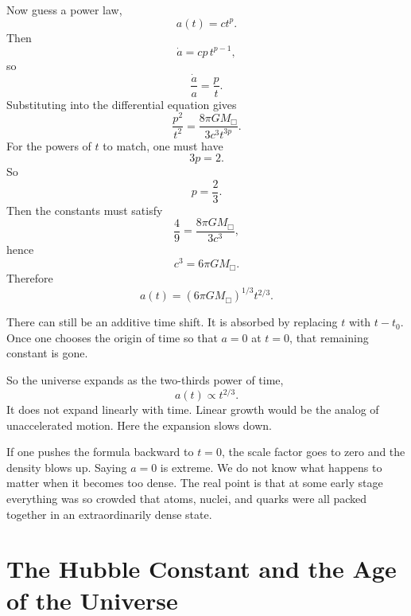 Now guess a power law,
\begin{equation}
a(t)=ct^p.
\end{equation}
Then
\begin{equation}
\dot a = cp\,t^{p-1},
\end{equation}
so
\begin{equation}
\frac{\dot a}{a}=\frac{p}{t}.
\end{equation}
Substituting into the differential equation gives
\begin{equation}
\frac{p^2}{t^2}=\frac{8\pi G M_{\Box}}{3c^3t^{3p}}.
\end{equation}
For the powers of \(t\) to match, one must have
\begin{equation}
3p=2.
\end{equation}
So
\begin{equation}
p=\frac{2}{3}.
\end{equation}
Then the constants must satisfy
\begin{equation}
\frac{4}{9}=\frac{8\pi G M_{\Box}}{3c^3},
\end{equation}
hence
\begin{equation}
c^3=6\pi G M_{\Box}.
\end{equation}
Therefore
\begin{equation}
a(t)=\left(6\pi G M_{\Box}\right)^{1/3}t^{2/3}.
\end{equation}

There can still be an additive time shift. It is absorbed by replacing \(t\) with \(t-t_0\). Once one chooses the origin of time so that \(a=0\) at \(t=0\), that remaining constant is gone.

So the universe expands as the two-thirds power of time,
\begin{equation}
a(t)\propto t^{2/3}.
\end{equation}
It does not expand linearly with time. Linear growth would be the analog of unaccelerated motion. Here the expansion slows down.

If one pushes the formula backward to \(t=0\), the scale factor goes to zero and the density blows up. Saying \(a=0\) is extreme. We do not know what happens to matter when it becomes too dense. The real point is that at some early stage everything was so crowded that atoms, nuclei, and quarks were all packed together in an extraordinarily dense state.

\section{The Hubble Constant and the Age of the Universe}

